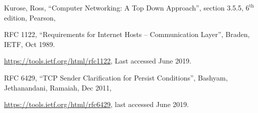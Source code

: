 \begin{multicols}{2}
\begin{thebibliography}{99}
 Kurose, Ross, “Computer Networking: A Top Down Approach”, section 3.5.5, $6^{\text{th}}$ edition, Pearson, 

RFC 1122, “Requirements for Internet Hosts -- Communication Layer”, Braden, IETF, Oct 1989. 

\url{https://tools.ietf.org/html/rfc1122}, Last accessed June 2019.

 RFC 6429, “TCP Sender Clarification for Persist Conditions”, Bashyam, Jethanandani, Ramaiah, Dec 2011, 

\url{https://tools.ietf.org/html/rfc6429}, last accessed June 2019.

\end{thebibliography}
\end{multicols}
